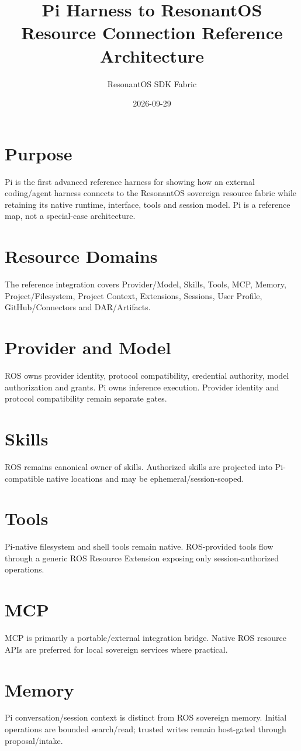 \documentclass{article}
\title{Pi Harness to ResonantOS Resource Connection Reference Architecture}
\author{ResonantOS SDK Fabric}
\date{2026-09-29}
\begin{document}
\maketitle
\section{Purpose}
Pi is the first advanced reference harness for showing how an external coding/agent harness connects to the ResonantOS sovereign resource fabric while retaining its native runtime, interface, tools and session model. Pi is a reference map, not a special-case architecture.
\section{Resource Domains}
The reference integration covers Provider/Model, Skills, Tools, MCP, Memory, Project/Filesystem, Project Context, Extensions, Sessions, User Profile, GitHub/Connectors and DAR/Artifacts.
\section{Provider and Model}
ROS owns provider identity, protocol compatibility, credential authority, model authorization and grants. Pi owns inference execution. Provider identity and protocol compatibility remain separate gates.
\section{Skills}
ROS remains canonical owner of skills. Authorized skills are projected into Pi-compatible native locations and may be ephemeral/session-scoped.
\section{Tools}
Pi-native filesystem and shell tools remain native. ROS-provided tools flow through a generic ROS Resource Extension exposing only session-authorized operations.
\section{MCP}
MCP is primarily a portable/external integration bridge. Native ROS resource APIs are preferred for local sovereign services where practical.
\section{Memory}
Pi conversation/session context is distinct from ROS sovereign memory. Initial operations are bounded search/read; trusted writes remain host-gated through proposal/intake.
\end{document}
